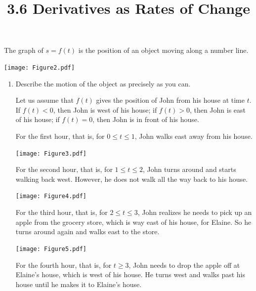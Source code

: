 \documentclass[nooutcomes]{ximera}
\title{3.6 Derivatives as Rates of Change}
\begin{document}
\begin{abstract}		\end{abstract}
\maketitle


\begin{problem}
The graph of $s=f(t)$ is the position of an object moving along a number line.
	\begin{image}
	\texttt{[image: Figure2.pdf]}
	\end{image}
	
	\begin{enumerate}
	
	\item  Describe the motion of the object as precisely as you can.
		\begin{freeResponse}
		Let us assume that $f(t)$ gives the position of John from his house at time $t$.  If $f(t) < 0$, then John is west of his house;  if $f(t) > 0$, then John is east of his house; if $f(t)=0$, then John is in front of his house.  
		
		For the first hour, that is, for $0 \leq t \leq 1$, John walks east away from his house.
		
		\begin{image}
		\texttt{[image: Figure3.pdf]}
		\end{image}
	
		For the second hour, that is, for $1 \leq t \leq 2$, John turns around and starts walking back west.  However, he does not walk all the way back to his house.
		
		\begin{image}
		\texttt{[image: Figure4.pdf]}
		\end{image}
		
		For the third hour, that is, for $2\le t\le 3$, John realizes he needs to pick up an apple from the grocery store, which is way east of his house, for Elaine.  So he turns around again and walks east to the store.
		
		\begin{image}
		\texttt{[image: Figure5.pdf]}
		\end{image}
		
		For the fourth hour, that is, for $t \ge 3$, John needs to drop the apple off at Elaine's house, which is west of his house.  He turns west and walks past his house until he makes it to Elaine's house.
		

\end{freeResponse}
\end{enumerate}
\end{problem}
\end{document}
